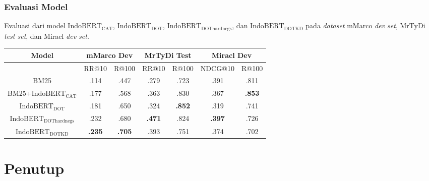 \documentclass[10pt]{beamer}
\newcommand{\f}[1]{\textit{#1}}
\newcommand{\bo}[1]{\textbf{#1}}
\begin{document}
\begin{frame}
    \frametitle{Evaluasi Model}
    Evaluasi dari model $\text{IndoBERT}_{\text{CAT}}$, $\text{IndoBERT}_{\text{DOT}}$, $\text{IndoBERT}_{\text{DOThardnegs}}$, dan $\text{IndoBERT}_{\text{DOTKD}}$ pada \f{dataset} mMarco \f{dev set}, MrTyDi \f{test set}, dan Miracl \f{dev set}.
    \begin{table}[!ht]
        \centering
        \footnotesize
        \label{tab:evaluasisemuamodel}
        \begin{tabular}{|c|c|c|c|c|c|c|} \hline
            Model                             & \multicolumn{2}{c|}{mMarco Dev} &
            \multicolumn{2}{c|}{MrTyDi Test} & \multicolumn{2}{c|}{Miracl Dev}                                             \\ \hline
                                              & RR@10 & R@100 & RR@10 & R@100 & NDCG@10 & R@100 \\ \hline
            BM25                              & .114  & .447   & .279   & .723   & .391    & .811 \\ \hline
            BM25+$\text{IndoBERT}_{\text{CAT}}$    & .177  & .568   & .363   & .830   & .367    & \bo{.853} \\ \hline
            $\text{IndoBERT}_{\text{DOT}}$    & .181  & .650   & .324   & \bo{.852}   & .319    & .741 \\ \hline
            $\text{IndoBERT}_{\text{DOThardnegs}}$    & .232  & .680   & \bo{.471}   & .824   & \bo{.397}    & .726 \\ \hline
            $\text{IndoBERT}_{\text{DOTKD}}$  & \bo{.235}  & \bo{.705}   & .393   & .751   & .374    & .702    \\ \hline
        \end{tabular}
    \end{table}
\end{frame}


\section{Penutup}
\end{document}
